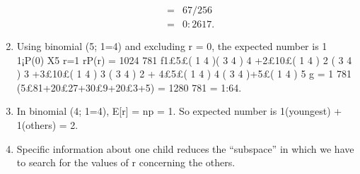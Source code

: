 \documentclass[a4paper,12pt]{article}
\begin{document}
\begin{enumerate}
\begin{eqnarray*}
 &=& 67/256 \\
 &=& 0:2617.
\end{eqnarray*}

\item  Using binomial (5; 1=4) and excluding r = 0, the expected number is
1
1¡P(0)
X5
r=1
rP(r) =
1024
781
f1£5£(
1
4
)(
3
4
)
4
+2£10£(
1
4
)
2
(
3
4
)
3
+3£10£(
1
4
)
3
(
3
4
)
2
+
4£5£(
1
4
)
4
(
3
4
)+5£(
1
4
)
5
g =
1
781
(5£81+20£27+30£9+20£3+5) =
1280
781
= 1:64.

\item In binomial (4; 1=4), E[r] = np = 1.
So expected number is 1(youngest) + 1(others) = 2.
\item Specific information about one child reduces the “subspace” in which we
have to search for the values of r concerning the others.
\end{enumerate}
\end{document}
